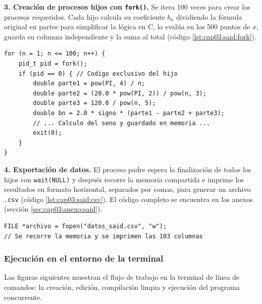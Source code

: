 \textbf{3. Creación de procesos hijos con \texttt{fork()}.} Se itera 100 veces para crear los procesos requeridos. Cada hijo calcula su coeficiente $b_n$ dividiendo la fórmula original en partes para simplificar la lógica en C, lo evalúa en los 500 puntos de $x$, guarda su columna independiente y la suma al total (código \ref{lst:cap03:said:fork}).

\begin{lstlisting}[style=C, caption={Creación de los 100 procesos hijos y cálculo del coeficiente $b_n$.}, label={lst:cap03:said:fork}]
for (n = 1; n <= 100; n++) {
    pid_t pid = fork();
    if (pid == 0) { // Codigo exclusivo del hijo
        double parte1 = pow(PI, 4) / n;
        double parte2 = (20.0 * pow(PI, 2)) / pow(n, 3);
        double parte3 = 120.0 / pow(n, 5);
        double bn = 2.0 * signo * (parte1 - parte2 + parte3);
        // ... Calculo del seno y guardado en memoria ...
        exit(0);
    }
}
\end{lstlisting}

\textbf{4. Exportación de datos.} El proceso padre espera la finalización de todos los hijos con \texttt{wait(NULL)} y después recorre la memoria compartida e imprime los resultados en formato horizontal, separados por comas, para generar un archivo \texttt{.csv} (código \ref{lst:cap03:said:csv}). El código completo se encuentra en los anexos (sección \ref{sec:cap03:anexo:said}).

\begin{lstlisting}[style=C, caption={Apertura del archivo CSV de salida.}, label={lst:cap03:said:csv}]
FILE *archivo = fopen("datos_said.csv", "w");
// Se recorre la memoria y se imprimen las 103 columnas
\end{lstlisting}

\subsubsection{Ejecución en el entorno de la terminal}
\label{sec:cap03:said:ejecucion}

Las figuras siguientes muestran el flujo de trabajo en la terminal de línea de comandos: la creación, edición, compilación limpia y ejecución del programa concurrente.



